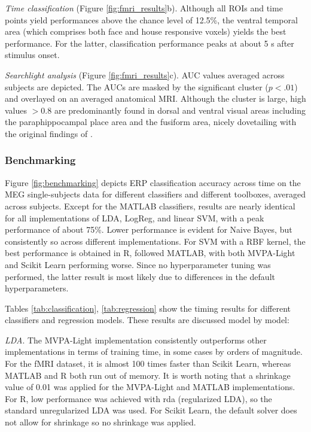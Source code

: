 \documentclass[utf8]{frontiersSCNS} %
\begin{document}
\textit{Time classification} (Figure \ref{fig:fmri_results}b). Although all ROIs and time points yield performances above the chance level of 12.5\%, the ventral temporal area (which comprises both face and house responsive voxels) yields the best performance. For the latter, classification performance peaks at about 5 s after stimulus onset.

\textit{Searchlight analysis} (Figure \ref{fig:fmri_results}c). AUC values averaged across subjects are depicted. The AUCs are masked by the significant cluster ($p < .01$) and overlayed on an averaged anatomical MRI. Although the cluster is large, high values $>0.8$ are predominantly found in dorsal and ventral visual areas including the paraphippocampal place area and the fusiform area, nicely dovetailing with the original findings of \cite{Haxby2001}.

\subsubsection{Benchmarking}

Figure \ref{fig:benchmarking} depicts ERP classification accuracy across time on the MEG single-subjects data for different classifiers and different toolboxes, averaged across subjects. Except for the MATLAB classifiers, results are nearly identical  for all implementations of LDA, LogReg, and linear SVM, with a peak performance of about 75\%. Lower performance is evident for Naive Bayes, but consistently so across different implementations. For SVM with a RBF kernel, the best performance is obtained in R, followed MATLAB, with both MVPA-Light and Scikit Learn performing worse. Since no hyperparameter tuning was performed, the latter result is most likely due to differences in the default hyperparameters. 

Tables \ref{tab:classification}, \ref{tab:regression} show the timing results for different classifiers and regression models. These results are discussed model by model:

\textit{LDA}. The MVPA-Light implementation consistently outperforms other implementations in terms of training time, in some cases by orders of magnitude. For the fMRI dataset, it is almost 100 times faster than Scikit Learn, whereas MATLAB and R both run out of memory. It is worth noting that a shrinkage value of 0.01 was applied for the MVPA-Light and MATLAB implementations. For R, low performance was achieved with rda (regularized LDA), so the standard unregularized LDA was used. For Scikit Learn, the default solver does not allow for shrinkage so no shrinkage was applied.
\end{document}
